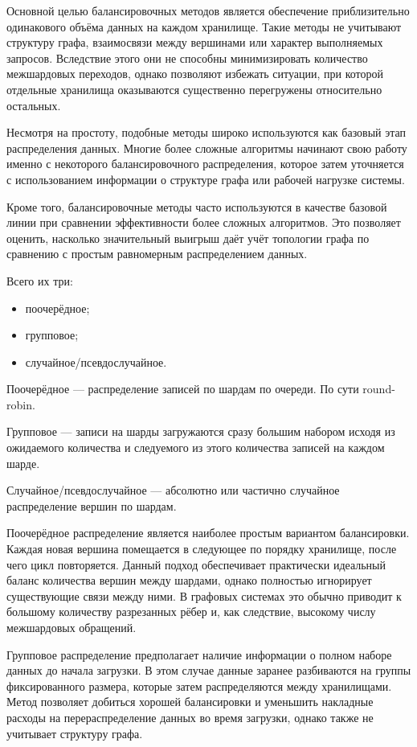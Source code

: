 Основной целью балансировочных методов является обеспечение приблизительно одинакового объёма данных на каждом хранилище. Такие методы не учитывают структуру графа, взаимосвязи между вершинами или характер выполняемых запросов. Вследствие этого они не способны минимизировать количество межшардовых переходов, однако позволяют избежать ситуации, при которой отдельные хранилища оказываются существенно перегружены относительно остальных.

Несмотря на простоту, подобные методы широко используются как базовый этап распределения данных. Многие более сложные алгоритмы начинают свою работу именно с некоторого балансировочного распределения, которое затем уточняется с использованием информации о структуре графа или рабочей нагрузке системы.

Кроме того, балансировочные методы часто используются в качестве базовой линии при сравнении эффективности более сложных алгоритмов. Это позволяет оценить, насколько значительный выигрыш даёт учёт топологии графа по сравнению с простым равномерным распределением данных.

Всего их три:
\begin{itemize}
    \item поочерёдное;
    \item групповое;
    \item случайное/псевдослучайное.
\end{itemize}

Поочерёдное --- распределение записей по шардам по очереди. По сути round-robin.

Групповое --- записи на шарды загружаются сразу большим набором исходя из ожидаемого количества и следуемого из этого количества записей на каждом шарде.

Случайное/псевдослучайное --- абсолютно или частично случайное распределение вершин по шардам.

Поочерёдное распределение является наиболее простым вариантом балансировки. Каждая новая вершина помещается в следующее по порядку хранилище, после чего цикл повторяется. Данный подход обеспечивает практически идеальный баланс количества вершин между шардами, однако полностью игнорирует существующие связи между ними. В графовых системах это обычно приводит к большому количеству разрезанных рёбер и, как следствие, высокому числу межшардовых обращений.

Групповое распределение предполагает наличие информации о полном наборе данных до начала загрузки. В этом случае данные заранее разбиваются на группы фиксированного размера, которые затем распределяются между хранилищами. Метод позволяет добиться хорошей балансировки и уменьшить накладные расходы на перераспределение данных во время загрузки, однако также не учитывает структуру графа.

